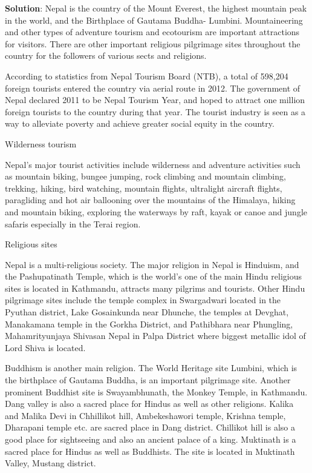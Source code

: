 \documentclass[
  openany]{book}
\newenvironment{solution}{ {\bfseries Solution}:}{}
\begin{document}
\begin{questions}
\begin{solution}
Nepal is the country of the Mount Everest, the highest mountain peak in the world, and the Birthplace of Gautama Buddha- Lumbini. Mountaineering and other types of adventure tourism and ecotourism are important attractions for visitors. There are other important religious pilgrimage sites throughout the country for the followers of various sects and religions.

According to statistics from Nepal Tourism Board (NTB), a total of 598,204 foreign tourists entered the country via aerial route in 2012. The government of Nepal declared 2011 to be Nepal Tourism Year, and hoped to attract one million foreign tourists to the country during that year. The tourist industry is seen as a way to alleviate poverty and achieve greater social equity in the country.

Wilderness tourism

Nepal’s major tourist activities include wilderness and adventure activities such as mountain biking, bungee jumping, rock climbing and mountain climbing, trekking, hiking, bird watching, mountain flights, ultralight aircraft flights, paragliding and hot air ballooning over the mountains of the Himalaya, hiking and mountain biking, exploring the waterways by raft, kayak or canoe and jungle safaris especially in the Terai region.

Religious sites

Nepal is a multi-religious society. The major religion in Nepal is Hinduism, and the Pashupatinath Temple, which is the world’s one of the main Hindu religious sites is located in Kathmandu, attracts many pilgrims and tourists. Other Hindu pilgrimage sites include the temple complex in Swargadwari located in the Pyuthan district, Lake Gosainkunda near Dhunche, the temples at Devghat, Manakamana temple in the Gorkha District, and Pathibhara near Phungling, Mahamrityunjaya Shivasan Nepal in Palpa District where biggest metallic idol of Lord Shiva is located.

Buddhism is another main religion. The World Heritage site Lumbini, which is the birthplace of Gautama Buddha, is an important pilgrimage site. Another prominent Buddhist site is Swayambhunath, the Monkey Temple, in Kathmandu. Dang valley is also a sacred place for Hindus as well as other religions. Kalika and Malika Devi in Chhillikot hill, Ambekeshawori temple, Krishna temple, Dharapani temple etc. are sacred place in Dang district. Chillikot hill is also a good place for sightseeing and also an ancient palace of a king. Muktinath is a sacred place for Hindus as well as Buddhists. The site is located in Muktinath Valley, Mustang district.


\end{solution}
\end{questions}
\end{document}
